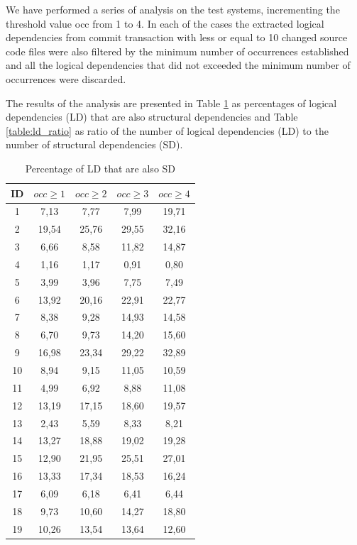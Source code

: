 \documentclass[12pt]{mitthesis}
\begin{document}
We have performed a series of analysis on the test systems, incrementing the threshold value occ from 1 to 4. In each of the cases the extracted logical dependencies from commit transaction with less or equal to 10 changed source code files were also filtered by the minimum number of occurrences established and all the logical dependencies that did not exceeded the minimum number of occurrences were discarded. 

The results of the analysis are presented in Table \ref{table:sd_percentages} as percentages of logical dependencies (LD) that are also structural dependencies and Table \ref{table:ld_ratio} as ratio of the number of logical dependencies (LD) to the number of structural dependencies (SD).



\begin{table}[H]
\caption{Percentage of LD that are also SD}
\label{table:sd_percentages}
\centering
\begin{tabular}{|c|c|c|c|c|}
\hline
    ID  & $occ\geq 1$ & $occ\geq 2$ & $occ\geq 3$ & $occ\geq 4$  \\
\hline
1	&	7,13	&	7,77	&	7,99	&	19,71	\\
2	&	19,54	&	25,76	&	29,55	&	32,16	\\
3	&	6,66	&	8,58	&	11,82	&	14,87	\\
4	&	1,16	&	1,17	&	0,91	&	0,80	\\
5	&	3,99	&	3,96	&	7,75	&	7,49	\\
6	&	13,92	&	20,16	&	22,91	&	22,77	\\
7	&	8,38	&	9,28	&	14,93	&	14,58	\\
8	&	6,70	&	9,73	&	14,20	&	15,60	\\
9	&	16,98	&	23,34	&	29,22	&	32,89	\\
10	&	8,94	&	9,15	&	11,05	&	10,59	\\
11	&	4,99	&	6,92	&	8,88	&	11,08	\\
12	&	13,19	&	17,15	&	18,60	&	19,57	\\
13	&	2,43	&	5,59	&	8,33	&	8,21	\\
14	&	13,27	&	18,88	&	19,02	&	19,28	\\
15	&	12,90	&	21,95	&	25,51	&	27,01	\\
16	&	13,33	&	17,34	&	18,53	&	16,24	\\
17	&	6,09	&	6,18	&	6,41	&	6,44	\\
18	&	9,73	&	10,60	&	14,27	&	18,80	\\
19	&	10,26	&	13,54	&	13,64	&	12,60	\\

\end{tabular}
\end{table}
\end{document}
